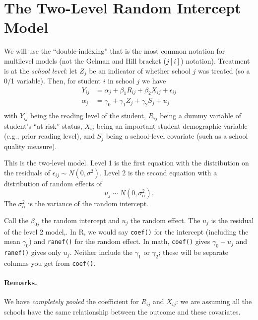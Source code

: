 \documentclass[
  letterpaper,
  DIV=11,
  numbers=noendperiod]{scrreprt}
\let\oldparagraph\paragraph
\renewcommand{\paragraph}[1]{\oldparagraph{#1}\mbox{}}
\begin{document}
\section{The Two-Level Random Intercept
Model}\label{the-two-level-random-intercept-model}

We will use the ``double-indexing'' that is the most common notation for
multilevel models (not the Gelman and Hill bracket (\(j[i]\)) notation).
Treatment is at the \emph{school level}: let \(Z_j\) be an indicator of
whether school \(j\) was treated (so a 0/1 variable). Then, for student
\(i\) in school \(j\) we have \[\begin{aligned}
Y_{ij} &= \alpha_{j} + \beta_{1} R_{ij} + \beta_{2} X_{ij} + \epsilon_{ij} \\
\alpha_{j} &= \gamma_{0} + \gamma_{1} Z_{j} + \gamma_{2} S_{j} + u_{j} \\
\end{aligned}\] with \(Y_{ij}\) being the reading level of the student,
\(R_{ij}\) being a dummy variable of student's ``at risk'' status,
\(X_{ij}\) being an important student demographic variable (e.g., prior
reading level), and \(S_j\) being a school-level covariate (such as a
school quality measure).

This is the two-level model. Level 1 is the first equation with the
distribution on the residuals of
\(\epsilon_{ij} \sim N( 0, \sigma^2 )\). Level 2 is the second equation
with a distribution of random effects of
\[u_{j} \sim N( 0, \sigma^2_\alpha ) .\] The \(\sigma^2_\alpha\) is the
variance of the random intercept.

Call the \(\beta_{0j}\) the random intercept and \(u_{j}\) the random
effect. The \(u_{j}\) is the residual of the level 2 model,. In R, we
would say \texttt{coef()} for the intercept (including the mean
\(\gamma_0\)) and \texttt{ranef()} for the random effect. In math,
\texttt{coef()} gives \(\gamma_0 + u_j\) and \texttt{ranef()} gives only
\(u_j\). Neither include the \(\gamma_1\) or \(\gamma_2\); these will be
separate columns you get from \texttt{coef()}.

\paragraph{Remarks.}\label{remarks.}

We have \emph{completely pooled} the coefficient for \(R_{ij}\) and
\(X_{ij}\): we are assuming all the schools have the same relationship
between the outcome and these covariates.
\end{document}
